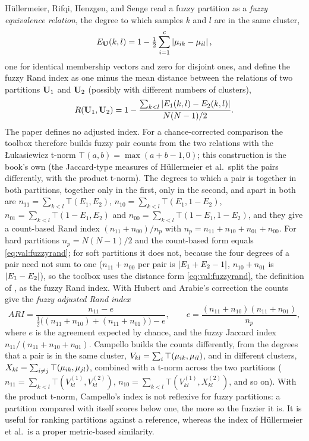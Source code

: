 Hüllermeier, Rifqi, Henzgen, and Senge \cite{hullermeier:2012:rand} read a fuzzy partition as a \emph{fuzzy equivalence relation}, the degree to which samples $k$ and $l$ are in the same cluster,
\begin{equation}
  E_{\mathbf{U}}(k,l)=1-\tfrac12\sum_{i=1}^{c}\left\lvert \mu_{ik}-\mu_{il} \right\rvert,
  \label{eq:val:equivalence}
\end{equation}
one for identical membership vectors and zero for disjoint ones, and define the fuzzy Rand index as one minus the mean distance between the relations of two partitions $\mathbf{U}_1$ and $\mathbf{U}_2$ (possibly with different numbers of clusters),
\begin{equation}
  R(\mathbf{U}_1,\mathbf{U}_2)=1-\frac{\sum_{k<l}\left\lvert E_1(k,l)-E_2(k,l) \right\rvert}{N(N-1)/2}.
  \label{eq:val:fuzzyrand}
\end{equation}
The paper defines no adjusted index. For a chance-corrected comparison the toolbox therefore builds fuzzy pair counts from the two relations with the Łukasiewicz t-norm $\top(a,b)=\max(a+b-1,0)$; this construction is the book's own (the Jaccard-type measures of Hüllermeier et al.\ split the pairs differently, with the product t-norm). The degrees to which a pair is together in both partitions, together only in the first, only in the second, and apart in both are $n_{11}=\sum_{k<l}\top(E_1,E_2)$, $n_{10}=\sum_{k<l}\top(E_1,1-E_2)$, $n_{01}=\sum_{k<l}\top(1-E_1,E_2)$ and $n_{00}=\sum_{k<l}\top(1-E_1,1-E_2)$, and they give a count-based Rand index $(n_{11}+n_{00})/n_p$ with $n_p=n_{11}+n_{10}+n_{01}+n_{00}$. For hard partitions $n_p=N(N-1)/2$ and the count-based form equals \eqref{eq:val:fuzzyrand}; for soft partitions it does not, because the four degrees of a pair need not sum to one ($n_{11}+n_{00}$ per pair is $\left\lvert E_1+E_2-1 \right\rvert$, $n_{10}+n_{01}$ is $\left\lvert E_1-E_2 \right\rvert$), so the toolbox uses the distance form \eqref{eq:val:fuzzyrand}, the definition of \cite{hullermeier:2012:rand}, as the fuzzy Rand index. With Hubert and Arabie's correction the counts give the \emph{fuzzy adjusted Rand index}
\begin{equation}
  ARI=\frac{n_{11}-e}{\frac12\bigl((n_{11}+n_{10})+(n_{11}+n_{01})\bigr)-e},\qquad e=\frac{(n_{11}+n_{10})(n_{11}+n_{01})}{n_p},
  \label{eq:val:fuzzyari}
\end{equation}
where $e$ is the agreement expected by chance, and the fuzzy Jaccard index $n_{11}/(n_{11}+n_{10}+n_{01})$. Campello \cite{campello:2007:rand} builds the counts differently, from the degrees that a pair is in the same cluster, $V_{kl}=\sum_i\top(\mu_{ik},\mu_{il})$, and in different clusters, $X_{kl}=\sum_{i\ne j}\top(\mu_{ik},\mu_{jl})$, combined with a t-norm across the two partitions ($n_{11}=\sum_{k<l}\top(V^{(1)}_{kl},V^{(2)}_{kl})$, $n_{10}=\sum_{k<l}\top(V^{(1)}_{kl},X^{(2)}_{kl})$, and so on). With the product t-norm, Campello's index is not reflexive for fuzzy partitions: a partition compared with itself scores below one, the more so the fuzzier it is. It is useful for ranking partitions against a reference, whereas the index of Hüllermeier et al.\ is a proper metric-based similarity.

